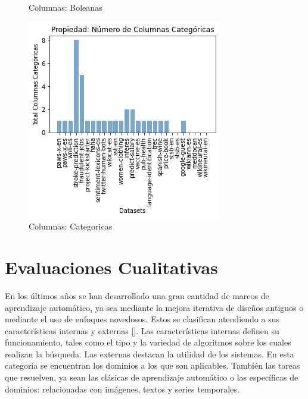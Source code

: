 \begin{figure}
\begin{minipage}[b]{0.31\textwidth}
        \caption{Columnas: Boleanas}
        \label{fig:columns-b}
  \end{minipage}      
\hspace{0.01cm}
    \begin{minipage}[b]{0.31\textwidth}
        \centering
        \includegraphics[width=\textwidth]{Graphics/results/columns_c.png}
          \caption{Columnas: Categoricas}
          \label{fig:columns-c}
        \end{minipage} 
\end{figure}


\section{Evaluaciones Cualitativas}\label{section:qualitative}

En los últimos años se han desarrollado una gran cantidad de marcos de aprendizaje automático, ya sea mediante la mejora iterativa de diseños antiguos o mediante 
el uso de enfoques novedosos. Estos se clasifican atendiendo a sus características internas y externas [\cite{52}]. Las características internas definen su 
funcionamiento, tales como el tipo y la variedad de algoritmos sobre los cuales realizan la búsqueda. Las externas 
destacan la utilidad de los sistemas. En esta categoría se encuentran los dominios a los que son aplicables. También las tareas que resuelven, ya sean las clásicas de 
aprendizaje automático o las específicas de dominios: relacionadas con imágenes, textos y series temporales. 

